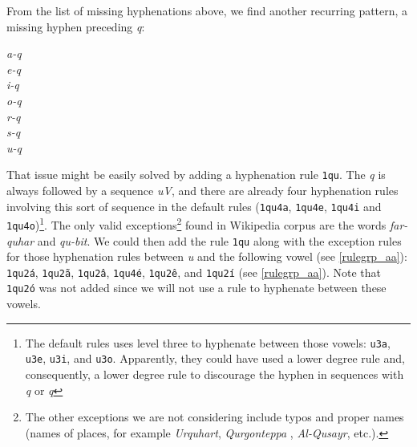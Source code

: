 From the list of missing hyphenations above, we find another recurring pattern, a missing hyphen preceding \emph{q}: 
\begin{multicols}{5}
\setlength{\columnsep}{0pt}
\setlength{\parindent}{0pt}
\emph{a-q \\ e-q \\ i-q \\ o-q \\ r-q \\ s-q \\ u-q}
\end{multicols}
That issue might be easily solved by adding a hyphenation rule \texttt{1qu}. The \emph{q} is always followed by 
a sequence \emph{uV}, and there are already four hyphenation rules involving this sort of sequence in the default rules
(\texttt{1qu4a}, \texttt{1qu4e}, \texttt{1qu4i} and \texttt{1qu4o})\footnote{The default rules uses level three to hyphenate
between those vowels: \texttt{u3a}, \texttt{u3e}, \texttt{u3i}, and \texttt{u3o}. Apparently, they could have used 
a lower degree rule and, consequently, a lower degree rule to discourage the hyphen in sequences with \emph{q} or \emph{q}}. 
The only valid exceptions\footnote{The other exceptions we are not considering include typos and proper names (names of places, for example \emph{Urquhart}, \emph{
Qurgonteppa
}, \emph{Al-Qusayr}, etc.).} found in Wikipedia corpus are
the words \emph{far-quhar} and \emph{qu-bit}. We could then add the rule \texttt{1qu} along with the exception rules
for those hyphenation rules between \emph{u} and the following vowel (see \cref{rulegrp_aa}):
\texttt{1qu2á}, \texttt{1qu2ã}, \texttt{1qu2â}, \texttt{1qu4é}, \texttt{1qu2ê}, and \texttt{1qu2í} (see \cref{rulegrp_aa}). 
Note that \texttt{1qu2ó} was not added since we will not use a rule to hyphenate between these vowels.

